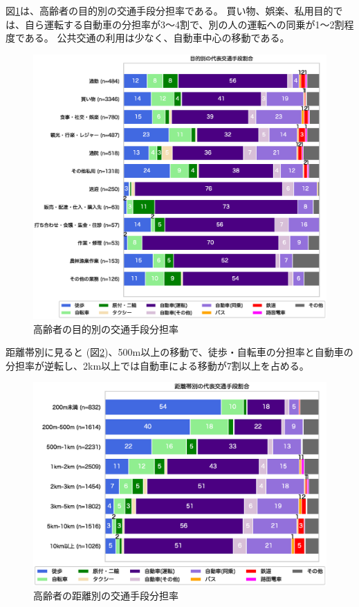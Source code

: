 \documentclass[a4paper,12pt, uplatex]{jsbook}
\begin{document}
\clearpage
図\ref{fig:mode_share_purpose_elder}は、高齢者の目的別の交通手段分担率である。
買い物、娯楽、私用目的では、自ら運転する自動車の分担率が3〜4割で、別の人の運転への同乗が1〜2割程度である。
公共交通の利用は少なく、自動車中心の移動である。
%
\begin{figure}[H]
    \centering
    \includegraphics[width=1.0\textwidth]{picture/mode_share_purpose_高齢者.eps}
    \caption{高齢者の目的別の交通手段分担率}
    \label{fig:mode_share_purpose_elder}
\end{figure}

\clearpage
距離帯別に見ると (図\ref{fig:mode_share_dist_elder})、500m以上の移動で、徒歩・自転車の分担率と自動車の分担率が逆転し、2km以上では自動車による移動が7割以上を占める。
\begin{figure}[H]
    \centering
    \includegraphics[width=1.0\textwidth]{picture/mode_share_distance_高齢者.eps}
    \caption{高齢者の距離別の交通手段分担率}
    \label{fig:mode_share_dist_elder}
\end{figure}
\end{document}
